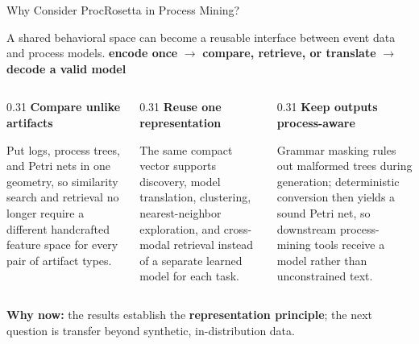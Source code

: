 \documentclass[aspectratio=169]{beamer}
\newcommand{\keyc}[1]{\textbf{\textcolor{procblue}{#1}}}
\newcommand{\keyg}[1]{\textbf{\textcolor{procgreen!70!black}{#1}}}
\newcommand{\keya}[1]{\textbf{\textcolor{procamber!85!black}{#1}}}
\begin{document}
\begin{frame}{Why Consider ProcRosetta in Process Mining?}
  \begin{block}{A shared behavioral space can become a reusable interface
    between event data and process models.}
    \centering
    \keyc{encode once} $\longrightarrow$ \keyg{compare, retrieve, or translate}
    $\longrightarrow$ \keyg{decode a valid model}
  \end{block}
  \vspace{1mm}
  \begin{columns}[T]
  \begin{column}{0.31\textwidth}
    \centering \keyc{Compare unlike artifacts}\par
    \vspace{1mm}\footnotesize
    Put logs, process trees, and Petri nets in one geometry, so similarity
    search and retrieval no longer require a different handcrafted feature
    space for every pair of artifact types.
  \end{column}
  \begin{column}{0.31\textwidth}
    \centering \keyg{Reuse one representation}\par
    \vspace{1mm}\footnotesize
    The same compact vector supports discovery, model translation,
    clustering, nearest-neighbor exploration, and cross-modal retrieval
    instead of a separate learned model for each task.
  \end{column}
  \begin{column}{0.31\textwidth}
    \centering \keya{Keep outputs process-aware}\par
    \vspace{1mm}\footnotesize
    Grammar masking rules out malformed trees during generation; deterministic
    conversion then yields a sound Petri net, so downstream process-mining
    tools receive a model rather than unconstrained text.
  \end{column}
  \end{columns}
  \vspace{2mm}
  \centering
  \textbf{Why now:} the results establish the \keyc{representation principle};
  the next question is transfer beyond synthetic, in-distribution data.
\end{frame}
\end{document}
